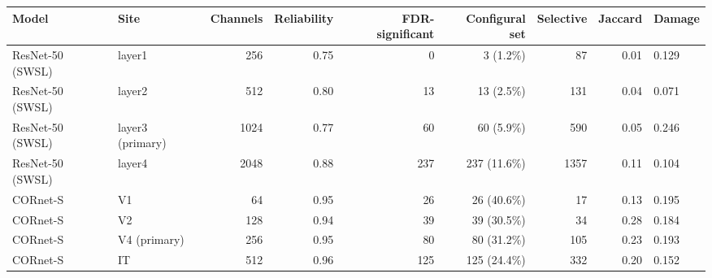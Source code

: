 \begin{tabular}{llrrrrrrl}
\hline
Model & Site & Channels & Reliability & FDR-significant & Configural set & Selective & Jaccard & Damage \\
\hline
ResNet-50 (SWSL) & layer1 & 256 & 0.75 & 0 & 3 (1.2\%) & 87 & 0.01 & 0.129 \\
ResNet-50 (SWSL) & layer2 & 512 & 0.80 & 13 & 13 (2.5\%) & 131 & 0.04 & 0.071 \\
ResNet-50 (SWSL) & layer3 (primary) & 1024 & 0.77 & 60 & 60 (5.9\%) & 590 & 0.05 & 0.246 \\
ResNet-50 (SWSL) & layer4 & 2048 & 0.88 & 237 & 237 (11.6\%) & 1357 & 0.11 & 0.104 \\
CORnet-S & V1 & 64 & 0.95 & 26 & 26 (40.6\%) & 17 & 0.13 & 0.195 \\
CORnet-S & V2 & 128 & 0.94 & 39 & 39 (30.5\%) & 34 & 0.28 & 0.184 \\
CORnet-S & V4 (primary) & 256 & 0.95 & 80 & 80 (31.2\%) & 105 & 0.23 & 0.193 \\
CORnet-S & IT & 512 & 0.96 & 125 & 125 (24.4\%) & 332 & 0.20 & 0.152 \\
\hline
\end{tabular}